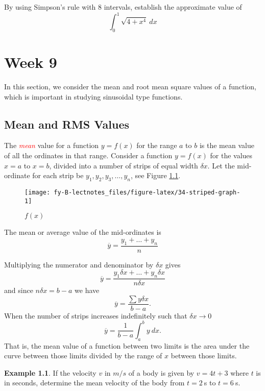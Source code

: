 \documentclass[
  11pt,
  oneside]{book}
\newcommand{\slide}{}
\theoremstyle{definition}
\theoremstyle{definition}
\newtheorem{example}{Example}[chapter]
\theoremstyle{definition}
\theoremstyle{definition}
\theoremstyle{remark}
\begin{document}
By using Simpson's rule with 8 intervals, establish the approximate value of
\[
\int_0^1\sqrt{4+x^4}\ dx
\]

\chapter{Week 9}\label{week-nine}

In this section, we consider the mean and root mean square values of a function, which is important in studying sinusoidal type functions.

\slide

\section{Mean and RMS Values}\label{mean-and-rms-values}

The \textcolor{red}{\em mean} value for a function \(y = f(x)\) for the range \(a\) to \(b\) is the mean value of all the ordinates in that range. Consider a function \(y = f(x)\) for the values \(x = a\) to \(x = b\), divided into a number of strips of equal width \(\delta x\). Let the mid-ordinate for each strip be \(y_1, y_2, y_3,\ldots,y_n\), see Figure \ref{fig:34-striped-graph}.

\begin{figure}

{\centering \texttt{[image: fy-B-lectnotes\_files/figure-latex/34-striped-graph-1]} 

}

\caption{$f(x)$}\label{fig:34-striped-graph}
\end{figure}

The mean or average value of the mid-ordinates is
\[
\overline y=\frac{y_1+\ldots+y_n}{n}
\]
\slide

Multiplying the numerator and denominator by \(\delta x\) gives
\[
\overline y=\frac{y_1\delta x+\ldots+y_n\delta x}{n\delta x}
\]
and since \(n\delta x = b - a\) we have
\[
\overline y = \frac{\sum y\delta x}{b-a}.
\]
When the number of strips increases indefinitely such that \(\delta x \to 0\)
\[
\overline y = \frac{1}{b-a}\int_a^b y\ dx.
\]
That is, the mean value of a function between two limits is the area under the curve between those limits divided by the range of \(x\) between those limits.

\slide

\begin{example}
If the velocity \(v\) in \(m/s\) of a body is given by \(v=4t+3\) where \(t\) is in seconds, determine the mean velocity of the body from \(t=2\ \)s to \(t=6\ \)s.
\end{example}
\end{document}
